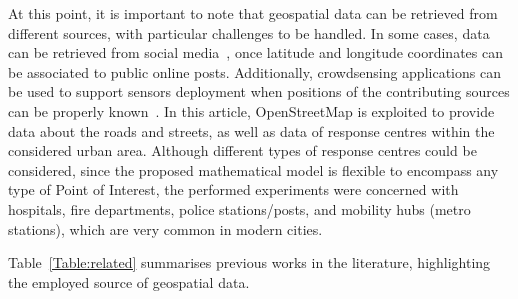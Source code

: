 \begin{refsection}
At this point, it is important to note that geospatial data can be retrieved from different sources, with particular challenges to be handled. In some cases, data can be retrieved from social media~\cite{twitterGeospatialSensors}, once latitude and longitude coordinates can be associated to public online posts. Additionally, crowdsensing applications can be used to support sensors deployment when positions of the contributing sources can be properly known~\cite{positioning5}. In this article, OpenStreetMap is exploited to provide data about the roads and streets, as well as data of response centres within the considered urban area. Although different types of response centres could be considered, since the proposed mathematical model is flexible to encompass any type of Point of Interest, the performed experiments were concerned with hospitals, fire departments, police stations/posts, and mobility hubs (metro stations), which are very common in modern cities. 

Table~\ref{Table:related} summarises previous works in the literature, highlighting the employed source of geospatial data. 

\begin{table}
  \centering
  \caption{Some works exploiting geospatial data to support sensors positioning and deployment.}\label{Table:related}
\end{table}


\end{refsection}
